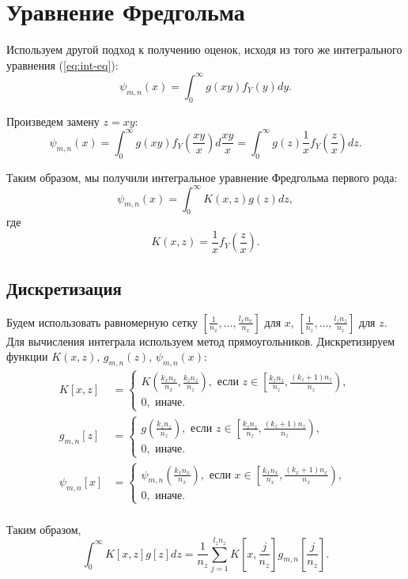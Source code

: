 \documentclass[../paper.tex]{subfiles}
\begin{document}
\section{Уравнение Фредгольма}
Используем другой подход к получению оценок, исходя из того же интегрального уравнения (\ref{eq:int-eq}):
\[
	\psi_{m,n}(x) = \int_{0}^{\infty} g(xy) f_Y(y) dy  
.\]

Произведем замену $z = xy$:
\[
	\psi_{m,n}(x) = \int_{0}^{\infty}  g(xy) f_Y\left(\frac{xy}{x}\right) d\frac{xy}{x}
	= \int_{0}^{\infty} g(z) \frac{1}{x} f_Y\left(\frac{z}{x}\right) dz  
.\]

Таким образом, мы получили интегральное уравнение Фредгольма первого рода:
\[
	\psi_{m,n}(x) = \int_{0}^{\infty} K(x, z) g(z) dz 
,\]
где
\[
	K(x, z) = \frac{1}{x} f_Y \left(\frac{z}{x}\right)
.\]

\subsection{Дискретизация}
Будем использовать равномерную сетку $\left[\frac{1}{n_x}, \dots, \frac{l_x n_x}{n_x}\right]$ для $x$, $\left[\frac{1}{n_z}, \dots, \frac{l_z n_z}{n_z}\right]$ для $z$.
Для вычисления интеграла используем метод прямоугольников.
Дискретизируем функции $K(x,z)$, $g_{m,n}(z)$, $\psi_{m,n}(x)$:
\begin{align*}
	K[x,z] 
	&=
	\begin{cases}
		K\left(\frac{k_x n_x}{n_x}, \frac{k_z n_z}{n_z} \right), \text{ если } 
			z \in \left[\frac{k_z n_z}{n_z}, \frac{(k_z+1)n_z}{n_z}\right),\\
		0, \text{ иначе.}
	\end{cases}\\
	g_{m,n}[z]
	&=
	\begin{cases}
		g\left(\frac{k_z n_z}{n_z}\right), \text{ если } z \in \left[\frac{k_z n_z}{n_z}, \frac{(k_z+1)n_z}{n_z}\right),\\
		0, \text{ иначе.}
	\end{cases}\\
	\psi_{m,n}[x]
	&=
	\begin{cases}
		\psi_{m,n}\left(\frac{k_x n_x}{n_x}\right), \text{ если } x \in \left[\frac{k_x n_x}{n_x}, \frac{(k_x+1)n_x}{n_x}\right),\\
		0, \text{ иначе.}
	\end{cases}\\
\end{align*}

Таким образом,
\[
	\int_{0}^{\infty} K[x,z] g[z] dz
	= \frac{1}{n_z} \sum_{j=1}^{l_z n_z} K\left[x, \frac{j}{n_z}\right] g_{m,n}\left[\frac{j}{n_z}\right] 
.\]
\end{document}
